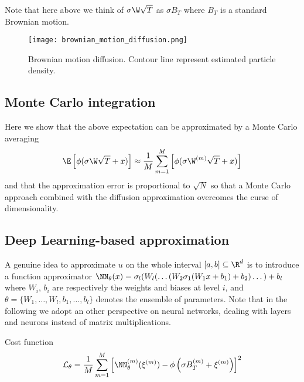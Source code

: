 Note that here above we think of $\sigma \W \sqrt{T}$ as $\sigma B_T$ where $B_T$ is a standard Brownian motion.

\begin{figure}
    \center
    \texttt{[image: brownian\_motion\_diffusion.png]}
    \caption{Brownian motion diffusion. Contour line represent estimated particle density.}
\end{figure}

\subsection*{Monte Carlo integration}
Here we show that the above expectation can be approximated by a Monte Carlo averaging
\begin{equation}
    \E\left[ \phi(\sigma \W \sqrt{T} + x)\right] \approx \frac{1}{M} \sum_{m=1}^M \left[ \phi(\sigma \W^{(m)} \sqrt{T} + x) \right]
\end{equation}
and that the approximation error is proportional to $\sqrt{N}$ so that a Monte Carlo approach combined with the diffusion approximation overcomes the curse of dimensionality.

\subsection*{Deep Learning-based approximation}

A genuine idea to approximate $u$ on the whole interval $[a,b] \subseteq \R^d$ is to introduce a function approximator 
$\NN_\theta(x) = \sigma_l (W_l (\dots (W_2 \sigma_1 (W_1 x + b_1) + b_2) \dots ) + b_l$
where 
$W_i$, $b_i$ 
are respectively the weights and biases at level $i$, and $\theta = \{W_1, \dots, W_l, b_1, \dots, b_l\}$ denotes the ensemble of parameters. Note that in the following we adopt an other perspective on neural networks, dealing with layers and neurons instead of matrix multiplications.

Cost function 
\begin{equation}
    \mathcal{L}_{\theta} = \frac{1}{M} \sum_{m=1}^M \left[ \NN_\theta^{(m)}(\xi^{(m)}) - \phi \left( \sigma B_T^{(m)} + \xi^{(m)}\right) \right]^2
\end{equation}

